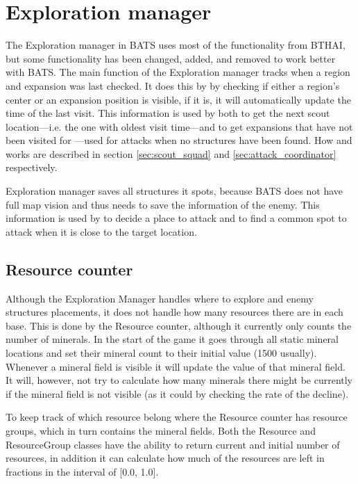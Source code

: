 \section{Exploration manager}
\label{sec:exploration_manager}
The Exploration manager in BATS uses most of the functionality from BTHAI, but some functionality has been changed, added, and removed to work better with BATS. The main function of the Exploration manager tracks when a region and expansion was last checked. It does this by by checking if either a region’s center or an expansion position is visible, if it is, it will automatically update the time of the last visit. This information is used by both  to get the next scout location—i.e. the one with oldest visit time—and  to get expansions that have not been visited for \attackCoordinatorExpansionNotCheckedTime—used for attacks when no structures have been found. How  and  works are described in section \ref{sec:scout_squad} and \ref{sec:attack_coordinator} respectively.

Exploration manager saves all structures it spots, because BATS does not have full map vision and thus needs to save the information of the enemy. This information is used by  to decide a place to attack and  to find a common spot to attack when it is close to the target location.

\subsection{Resource counter}
\label{sec:resource_counter}
Although the Exploration Manager handles where to explore and enemy structures placements, it does not handle how many resources there are in each base. This is done by the Resource counter, although it currently only counts the number of minerals. In the start of the game it goes through all static mineral locations and set their mineral count to their initial value (1500 usually). Whenever a mineral field is visible it will update the value of that mineral field. It will, however, not try to calculate how many minerals there might be currently if the mineral field is not visible (as it could by checking the rate of the decline).

To keep track of which resource belong where the Resource counter has resource groups, which in turn contains the mineral fields. Both the Resource and ResourceGroup classes have the ability to return current and initial number of resources, in addition it can calculate how much of the resources are left in fractions in the interval of [0.0, 1.0].